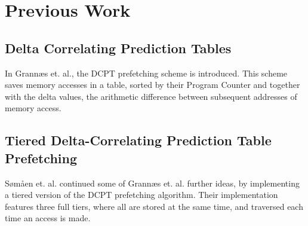 \section{Previous Work}

\subsection{Delta Correlating Prediction Tables}
In Grannæs et. al.\cite{Grannaes481837}, the DCPT prefetching scheme is
introduced. This scheme saves memory accesses in a table, sorted by their
Program Counter and together with the delta values, the arithmetic difference
between subsequent addresses of memory access. 

\subsection{Tiered Delta-Correlating Prediction Table Prefetching}
Sømåen et. al.\cite{Somaen} continued some of Grannæs et. al. further ideas, by
implementing a tiered version of the DCPT prefetching algorithm. Their
implementation features three full tiers, where all are stored at the same time,
and traversed each time an access is made.


